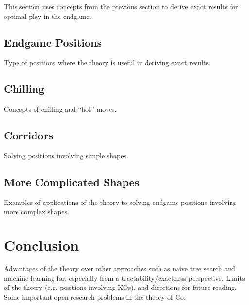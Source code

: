 \documentclass{article}[12pt]
\begin{document}
This section uses concepts from the previous section to derive exact 
results for optimal play in the endgame.

\subsection{Endgame Positions}
Type of positions where the theory is useful in deriving exact results.

\subsection{Chilling}
Concepts of chilling and ``hot'' moves.

\subsection{Corridors}
Solving positions involving simple shapes.

\subsection{More Complicated Shapes}
Examples of applications of the theory to solving endgame positions 
involving more complex shapes. 

\section{Conclusion}
Advantages of the theory over other approaches such as naive tree search and machine 
learning for, especially from a tractability/exactness perspective. Limits of the
theory (e.g. positions involving KOs), and directions for future reading. 
Some important open research problems in the theory of Go. 




\end{document}
